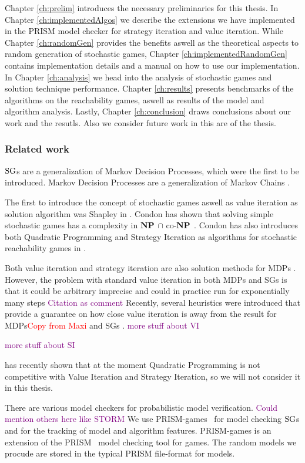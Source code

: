 Chapter \ref{ch:prelim} introduces the necessary preliminaries for this thesis.
In Chapter \ref{ch:implementedAlgos} we describe the extensions we have implemented in the PRISM model checker for strategy iteration and value iteration.
While Chapter \ref{ch:randomGen} provides the benefits aswell as the theoretical aspects to random generation of stochastic games,
Chapter \ref{ch:implementedRandomGen} contains implementation details and a manual on how to use our implementation.
In Chapter \ref{ch:analysis} we head into the analysis of stochastic games and solution technique performance.
Chapter \ref{ch:results} presents benchmarks of the algorithms on the reachability games, aswell as results of the model and algorithm analysis.
Lastly, Chapter \ref{ch:conclusion} draws conclusions about our work and the resutls. Also we consider future work in this are of the thesis.

\subsubsection{Related work}
$\textrm{SG}$s are a generalization of Markov Decision Processes, which were the first to be introduced. 
Markov Decision Processes are a generalization of Markov Chains \cite{Puterman} \cite[Ch.~11]{introProb}.

The first to introduce the concept of stochastic games aswell as value iteration as solution algorithm was Shapley in \cite{shapley}.
Condon has shown that solving simple stochastic games has a complexity in $\mathbf{NP}$ $\cap$ co-$\mathbf{NP}$ \cite{condonComplexity}.
Condon has also introduces both Quadratic Programming and Strategy Iteration as algorithms for stochastic reachability games in \cite{condonQP}. 

Both value iteration and strategy iteration are also solution methods for MDPs \cite{Puterman}\cite{https://pubsonline.informs.org/doi/abs/10.1287/mnsc.12.5.359 - Strategy Iteration for MDPs}.
However, the problem with standard value iteration in both MDPs and SGs is that it could be arbitrary imprecise \cite{haddadmonmege} and 
could in practice run for exponentially many steps \textcolor{purple}{Citation as comment}%
Recently, several heuristics were introduced that provide a guarantee on how close value iteration is away from the result for MDPs\textcolor{red}{Copy from Maxi} and SGs \cite{paperMaxi}.
\textcolor{purple}{more stuff about VI}

\textcolor{purple}{more stuff about SI}

\cite{GANDALF} has recently shown that at the moment Quadratic Programming is not competitive with Value Iteration and Strategy Iteration,
so we will not consider it in this thesis.

There are various model checkers for probabilistic model verification. \textcolor{purple}{Could mention others here like STORM}
We use PRISM-games~\cite{PRISM-games} for model checking $\textrm{SG}$s and for the tracking of model and algorithm features.
PRISM-games is an extension of the PRISM~\cite{PRISM} model checking tool for games. The random models we procude are stored in the
typical PRISM file-format for models.